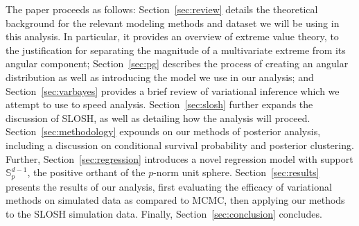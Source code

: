 The paper proceeds as follows:  Section~\ref{sec:review} details the theoretical background 
    for the relevant modeling methods and dataset we will be using in this analysis.  
    In particular, it provides an overview of extreme value theory, to the justification 
    for separating the magnitude of a multivariate extreme from its angular component; 
    Section~\ref{sec:pg} describes the process of creating an angular distribution as 
    well as introducing the model we use in 
    our analysis; and Section~\ref{sec:varbayes} provides a brief review of variational
    inference which we attempt to use to speed analysis.  Section~\ref{sec:slosh} further
    expands the discussion of SLOSH, as well as detailing how the analysis will proceed.
    Section~\ref{sec:methodology} expounds on our methods of posterior analysis, including
    a discussion on conditional survival probability and posterior clustering. Further,
    Section~\ref{sec:regression} introduces a novel regression model with support
    $\mathbb{S}_{p}^{d-1}$, the positive orthant of the $p$-norm unit sphere.
    Section~\ref{sec:results} presents the results of our analysis, first evaluating 
    the efficacy of variational methods on simulated data as compared to MCMC, 
    then applying our methods to the SLOSH simulation data.  Finally, 
    Section~\ref{sec:conclusion} concludes.

